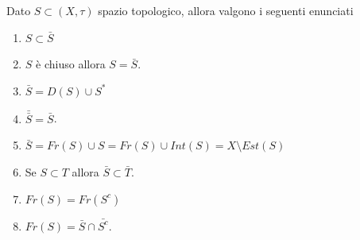 \begin{proposition}
	Dato $S \subset (X,\tau)$ spazio topologico, allora valgono i seguenti enunciati
	\begin{enumerate}
		\item $S \subset \bar{S}$
		\item $S$ è chiuso allora $S = \bar{S}$.
		\item $\bar{S} = D(S) \cup S^*$
		\item $\bar{\bar{S}} = \bar{S}$.
		\item $\bar{S} = Fr(S) \cup S = Fr(S) \cup Int(S) = X \setminus Est(S)$
		\item Se $S \subset  T$ allora $\bar{S} \subset \bar{T}$.
		\item $Fr(S) = Fr(S^c)$
		\item $Fr(S) = \bar{S} \cap \bar{S^c}$.
	\end{enumerate}
\end{proposition}

